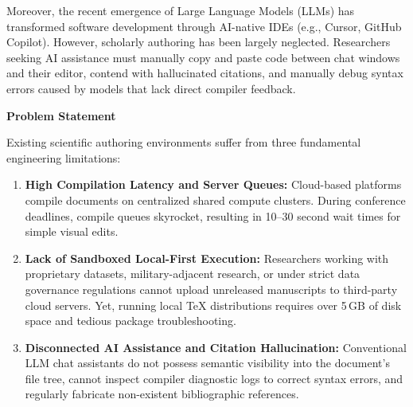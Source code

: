 \documentclass[12pt,a4paper,twoside]{article}
\newcommand{\subhead}[2]{%
  \begingroup\setlength{\parskip}{0pt}\vspace{10pt}%
  \noindent\hspace*{0.25in}\makebox[0.35in][l]{\fontsize{13pt}{15.6pt}\selectfont\bfseries #1}%
  {\fontsize{13pt}{15.6pt}\selectfont\bfseries #2}\par\nopagebreak
  \vspace{4pt}
  \endgroup}
\begin{document}
Moreover, the recent emergence of Large Language Models (LLMs) has transformed software development through AI-native IDEs (e.g., Cursor, GitHub Copilot). However, scholarly authoring has been largely neglected. Researchers seeking AI assistance must manually copy and paste code between chat windows and their editor, contend with hallucinated citations, and manually debug syntax errors caused by models that lack direct compiler feedback.

\subhead{1.2}{Problem Statement}
Existing scientific authoring environments suffer from three fundamental engineering limitations:
\begin{enumerate}[leftmargin=0.5in,labelindent=0pt,labelwidth=0.25in,labelsep=0pt,
                  itemsep=2pt,parsep=0pt,topsep=2pt,partopsep=0pt,align=left]
    \item \textbf{High Compilation Latency and Server Queues:} Cloud-based platforms compile documents on centralized shared compute clusters. During conference deadlines, compile queues skyrocket, resulting in 10--30 second wait times for simple visual edits.
    \item \textbf{Lack of Sandboxed Local-First Execution:} Researchers working with proprietary datasets, military-adjacent research, or under strict data governance regulations cannot upload unreleased manuscripts to third-party cloud servers. Yet, running local \TeX{} distributions requires over 5\,GB of disk space and tedious package troubleshooting.
    \item \textbf{Disconnected AI Assistance and Citation Hallucination:} Conventional LLM chat assistants do not possess semantic visibility into the document's file tree, cannot inspect compiler diagnostic logs to correct syntax errors, and regularly fabricate non-existent bibliographic references.
\end{enumerate}
\end{document}
